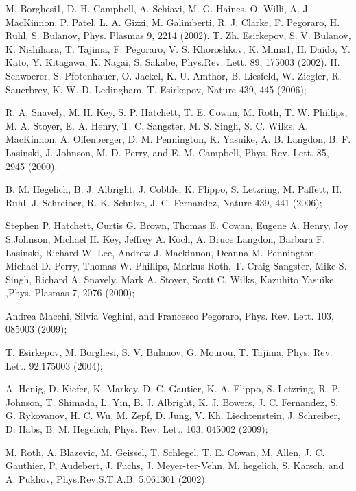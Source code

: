 \documentclass[aip,twocolumn,superscriptaddress,showpacs,amsmath]{revtex4}
\begin{document}
\begin{thebibliography}{28}
 M. Borghesi1, D. H. Campbell, A. Schiavi, M. G. Haines, O. Willi, A. J. MacKinnon, P. Patel, L. A. Gizzi, M. Galimberti, R. J. Clarke, F. Pegoraro, H. Ruhl, S. Bulanov, Phys. Plasmas 9, 2214 (2002).
T. Zh. Esirkepov, S. V. Bulanov, K. Nishihara, T. Tajima, F. Pegoraro, V. S. Khoroshkov, K. Mima1, H. Daido, Y. Kato, Y. Kitagawa, K. Nagai, S. Sakabe, Phys.Rev. Lett. 89, 175003 (2002).
H. Schwoerer, S. Pfotenhauer, O. Jackel, K. U. Amthor, B. Liesfeld, W.
Ziegler, R. Sauerbrey, K. W. D. Ledingham, T. Esirkepov, Nature 439, 445
(2006);

R. A. Snavely, M. H. Key, S. P. Hatchett, T. E. Cowan, M. Roth, T. W.
Phillips, M. A. Stoyer, E. A. Henry, T. C. Sangster, M. S. Singh, S. C. Wilks,
A. MacKinnon, A. Offenberger, D. M. Pennington, K. Yasuike, A. B. Langdon, B.
F. Lasinski, J. Johnson, M. D. Perry, and E. M. Campbell, Phys. Rev. Lett. 85,
2945 (2000).

B. M. Hegelich, B. J. Albright, J. Cobble, K. Flippo, S. Letzring,
M. Paffett, H. Ruhl, J. Schreiber, R. K. Schulze, J. C. Fernandez,
Nature 439, 441 (2006);



Stephen P. Hatchett, Curtis G. Brown, Thomas E. Cowan, Eugene A. Henry, Joy
S.Johnson, Michael H. Key, Jeffrey A. Koch, A. Bruce Langdon, Barbara F.
Lasinski, Richard W. Lee, Andrew J. Mackinnon, Deanna M. Pennington, Michael
D. Perry, Thomas W. Phillips, Markus Roth, T. Craig Sangster, Mike S. Singh,
Richard A. Snavely, Mark A. Stoyer, Scott C. Wilks, Kazuhito Yasuike ,Phys.
Plasmas 7, 2076 (2000);


 Andrea Macchi, Silvia Veghini, and Francesco Pegoraro,
Phys. Rev. Lett. 103, 085003 (2009);

 T. Esirkepov, M. Borghesi, S. V. Bulanov, G. Mourou,
T. Tajima, Phys. Rev. Lett. 92,175003 (2004);

A. Henig, D. Kiefer, K. Markey, D. C. Gautier, K. A. Flippo, S.
Letzring, R. P. Johnson, T. Shimada, L. Yin, B. J. Albright, K. J.
Bowers, J. C. Fernandez, S. G. Rykovanov, H. C. Wu, M. Zepf, D.
Jung, V. Kh. Liechtenstein, J. Schreiber, D. Habs, B. M. Hegelich,
Phys. Rev. Lett. 103, 045002 (2009);



 M. Roth, A. Blazevic, M. Geissel, T. Schlegel, T. E. Cowan,
M, Allen, J. C. Gauthier, P, Audebert, J. Fuchs, J. Meyer-ter-Vehn, M.
hegelich, S. Karsch, and A. Pukhov, Phys.Rev.S.T.A.B. 5,061301 (2002).


\end{thebibliography}
\end{document}
